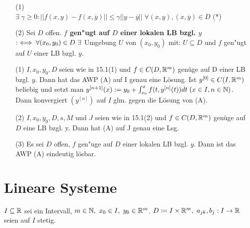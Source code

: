 \documentclass[a4paper,twoside,DIV15,BCOR12mm]{scrbook}
\begin{document}
\begin{definition}
\begin{itemize}
\item[(1)]
 \equizu \\
$\exists \; \gamma \geq 0 : ||f(x,y) - f(x,\overline{y})|| \leq \gamma ||y - \overline{y}|| \; \forall (x,y), (x,\overline{y}) \in D$ \; (*)
\item[(2)]
Sei $D$ offen. \textbf{$f$ gen"ugt auf $D$ einer lokalen LB bzgl. $y$} $:\equizu \forall (x_0,y_0)\in D\ \exists $ Umgebung $U$ von $(x_0,y_0)$ mit: $U\subseteq D$ und $f$ gen"ugt auf $U$ einer LB bzgl. $y$.
\end{itemize}
\end{definition}

\begin{satz} 
\begin{itemize}
\item[(1)]
$I, x_0, y_0, D$ seien wie in 15.1(1) und $f \in C(D,\mathbb{R}^m)$ genüge auf D einer LB bzgl. $y$.
Dann hat das AWP (A) auf I genau eine Lösung. Ist  $y^{[0]} \in C(I,\mathbb{R}^m)$ beliebig und setzt man $y^{[n+1]}(x) := y_0  + \int_{x_0}^{x} f(t,y^{[n]}(t)) dt \; (x \in I, n \in \mathbb{N})$. Dann konvergiert $(y^{[n]})$ auf $I$ glm. gegen die Lösung von (A).

\item[(2)] 
$I, x_0, y_0, D, s, M$ und $J$ seien wie in 15.1(2) und $f \in C(D,\mathbb{R}^m)$ genüge auf $D$ eine LB bzgl. y. Dann hat (A) auf J genau eine Lsg.

\item[(3)] 
Es sei $D$ offen, $f$ gen"uge auf $D$ einer lokalen LB bzgl. $y$. Dann ist das AWP (A) eindeutig lösbar.
\end{itemize}

\end{satz}



\chapter{Lineare Systeme}

\begin{vereinbarung}
$I\subseteq\mathbb{R}$ sei ein Intervall, $m\in\mathbb{N},\ x_0\in I,\ y_0\in\mathbb{R}^m$.
$D\mathrel{\mbox{$\coloneqq$}} I\times\mathbb{R}^m,\ a_{jk}, b_j:I\to\mathbb{R}$ seien auf $I$ stetig.
\end{vereinbarung}
\end{document}
